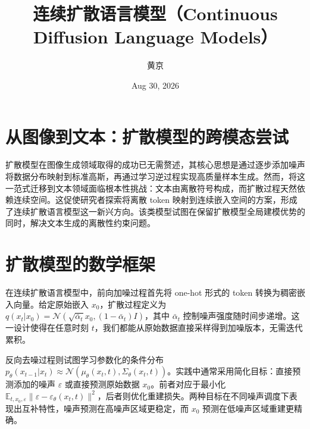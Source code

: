 \title{连续扩散语言模型（Continuous Diffusion Language Models）}
\author{黄京}
\date{Aug 30, 2026}
\maketitle
\chapter{从图像到文本：扩散模型的跨模态尝试}
扩散模型在图像生成领域取得的成功已无需赘述，其核心思想是通过逐步添加噪声将数据分布映射到标准高斯，再通过学习逆过程实现高质量样本生成。然而，将这一范式迁移到文本领域面临根本性挑战：文本由离散符号构成，而扩散过程天然依赖连续空间。这促使研究者探索将离散 token 映射到连续嵌入空间的方案，形成了连续扩散语言模型这一新兴方向。该类模型试图在保留扩散模型全局建模优势的同时，解决文本生成的离散性约束问题。\par
\chapter{扩散模型的数学框架}
在连续扩散语言模型中，前向加噪过程首先将 one-hot 形式的 token 转换为稠密嵌入向量。给定原始嵌入 $x_0$，扩散过程定义为 $q(x_t|x_0)=\mathcal{N}(\sqrt{\bar\alpha_t}x_0,(1-\bar\alpha_t)I)$，其中 $\bar\alpha_t$ 控制噪声强度随时间步递增。这一设计使得在任意时刻 $t$，我们都能从原始数据直接采样得到加噪版本，无需迭代累积。\par
反向去噪过程则试图学习参数化的条件分布 $p_\theta(x_{t-1}|x_t)\approx\mathcal{N}(\mu_\theta(x_t,t),\Sigma_\theta(x_t,t))$。实践中通常采用简化目标：直接预测添加的噪声 $\varepsilon$ 或直接预测原始数据 $x_0$。前者对应于最小化 $\mathbb{E}_{t,x_0,\varepsilon}\| \varepsilon - \varepsilon_\theta(x_t,t) \|^2$，后者则优化重建损失。两种目标在不同噪声调度下表现出互补特性，噪声预测在高噪声区域更稳定，而 $x_0$ 预测在低噪声区域重建更精确。\par
